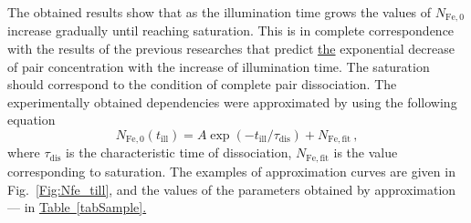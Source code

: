 \documentclass[%
 aip,jap,
 amsmath,amssymb,
 reprint,%
]{revtex4-1}
\begin{document}
The obtained results show that as the illumination time grows
the values of $N_\mathrm{Fe,0}$ increase gradually until reaching saturation.
This is in complete correspondence with the results of the previous researches \cite{FeBLight2,FeBAssJAP2014,FeBKin2019}
that predict \textcolor[rgb]{0.00,0.07,1.00}{\uline{the}}
exponential decrease of pair concentration with the increase of illumination time.
The saturation should correspond to the condition of complete pair dissociation.
The experimentally obtained dependencies were approximated by using the following equation
\begin{equation}
\label{eqNfe0Exp}
N_\mathrm{Fe,0}(t_\mathrm{ill})=A\exp(-t_\mathrm{ill}/\tau_\mathrm{dis})
+N_\mathrm{Fe,fit}\,,
\end{equation}
where
$\tau_\mathrm{dis}$ is the characteristic time of dissociation,
$N_\mathrm{Fe,fit}$ is the value corresponding to saturation.
The examples of approximation curves are given in Fig.~\ref{Fig:Nfe_till},
and the values of the parameters obtained by approximation --- in
\textcolor[rgb]{0.00,0.07,1.00}{\uline{
Table~\ref{tabSample}.}}
\end{document}
